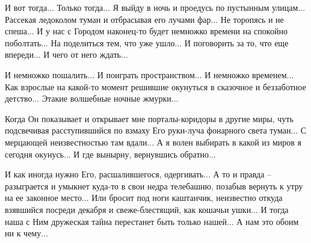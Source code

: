 И вот тогда... Только тогда... Я выйду в ночь и проедусь по пустынным улицам...
Рассекая ледоколом туман и отбрасывая его лучами фар... Не торопясь и не
спеша... И у нас с Городом наконец-то будет немножко времени на спокойно
поболтать... На поделиться тем, что уже ушло... И поговорить за то, что еще
впереди... И чего от него ждать...


И немножко пошалить... И поиграть пространством... И немножко временем... Как
взрослые на какой-то момент решившие окунуться в сказочное и беззаботное
детство... Этакие волшебные ночные жмурки... 

Когда Он показывает и открывает мне порталы-коридоры в другие миры, чуть
подсвечивая расступившийся по взмаху Его руки-луча фонарного света  туман... С
мерцающей неизвестностью там вдали... А я волен выбирать в какой из миров я
сегодня окунусь... И где вынырну, вернувшись обратно... 


И как иногда нужно Его, расшалившегося, одергивать... А то и правда –
разыграется и умыкнет куда-то в свои недра телебашню, позабыв вернуть к утру
на ее законное место... Или бросит под ноги каштанчик, неизвестно откуда
взявшийся посреди декабря и свеже-блестящий, как кошачьи ушки... И тогда наша
с Ним дружеская тайна перестанет быть только нашей... А нам это обоим ни к
чему...

